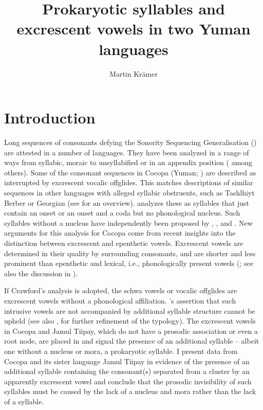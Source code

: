 \documentclass[output=paper,colorlinks,citecolor=brown]{langscibook}
\author{Martin Krämer\affiliation{UiT The Arctic University of Norway}}
\title{Prokaryotic syllables and excrescent vowels in two Yuman languages}
\begin{document}
\maketitle \label{ch10}

\section{Introduction} 
Long sequences of consonants defying the Sonority Sequencing Generalisation (\citealt{selkirk:1984,Zec1988, Zec2007,sonoritycycle}) are attested in a number of languages. They have been analyzed in a range of ways from syllabic, moraic to unsyllabified or in an appendix position (\citealt{Bagemihl1991,Lin1997,Ridouane2008,VauxWolfe2009,Zimmermann2013} among others). Some of the consonant sequences in Cocopa (Yuman; \citealt{Crawford1966}) are described as interrupted by excrescent vocalic offglides. This matches descriptions of similar sequences in other languages with alleged syllabic obstruents, such as Tashlhiyt Berber or Georgian (see \citealt{Easterday2019} for an overview). \citet{Crawford1966} analyzes these as syllables that just contain an onset or an onset and a coda but no phonological nucleus. Such syllables without a nucleus have independently been proposed by \citet{MccarthyPrince1990}, \citet{Broselow1992}, \citet{Shaw1994} and \citet{Repetti1994}. New arguments for this analysis for Cocopa come from recent insights into the distinction between excrescent and epenthetic vowels. Excrescent vowels are determined in their quality by surrounding consonants, and are shorter and less prominent than epenthetic and lexical, i.e., phonologically present vowels (\cite{Hall2006, Hall2011}; see also the discussion in \citealt{Easterday2019}).

If Crawford’s analysis is adopted, the schwa vowels or vocalic offglides are excrescent vowels without a phonological affiliation. \citet{Hall2006}'s assertion that such intrusive vowels are not accompanied by additional syllable structure cannot be upheld (see also , for further refinement of the typology). The excrescent vowels in Cocopa and Jamul Tiipay, which do not have a prosodic association or even a root node, are placed in and signal the presence of an additional syllable \-– albeit one without a nucleus or mora, a prokaryotic syllable. I present data from Cocopa and its sister language Jamul Tiipay in evidence of the presence of an additional syllable containing the consonant(s) separated from a cluster by an apparently excrescent vowel and conclude that the prosodic invisibility of such syllables must be caused by the lack of a nucleus and mora rather than the lack of a syllable. 
\end{document}
